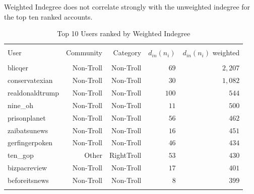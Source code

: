 \documentclass[12pt, titlepage=true, toc=bib]{scrartcl}
\begin{document}
Weighted Indegree does not correlate strongly with the unweighted indegree for the top ten ranked accounts.

\begin{table}[ht] \centering 
  \begin{tabular*}{.95\linewidth}{@{\extracolsep{\fill}} lrrrr} 
\\[-1.8ex]\hline 
\hline \\[-1.8ex] 
User & Community & Category & \( d_{in}(n_{i}) \) & \( d_{in}(n_{i}) \) weighted \\ 
\hline \\[-1.8ex] 
blicqer & Non-Troll & Non-Troll & $69$ & $2,207$ \\ 
conservatexian & Non-Troll & Non-Troll & $30$ & $1,082$ \\ 
realdonaldtrump & Non-Troll & Non-Troll & $100$ & $544$ \\ 
nine\_oh & Non-Troll & Non-Troll & $11$ & $500$ \\ 
prisonplanet & Non-Troll & Non-Troll & $56$ & $462$ \\ 
zaibatsunews & Non-Troll & Non-Troll & $16$ & $451$ \\ 
gerfingerpoken & Non-Troll & Non-Troll & $46$ & $434$ \\ 
ten\_gop & Other & RightTroll & $53$ & $430$ \\ 
bizpacreview & Non-Troll & Non-Troll & $17$ & $401$ \\ 
beforeitsnews & Non-Troll & Non-Troll & $8$ & $399$ \\ 
\hline \\[-1.8ex] 
\end{tabular*} 
\caption{Top 10 Users ranked by Weighted Indegree} 
  \label{tab:win} 
\end{table}
\end{document}
